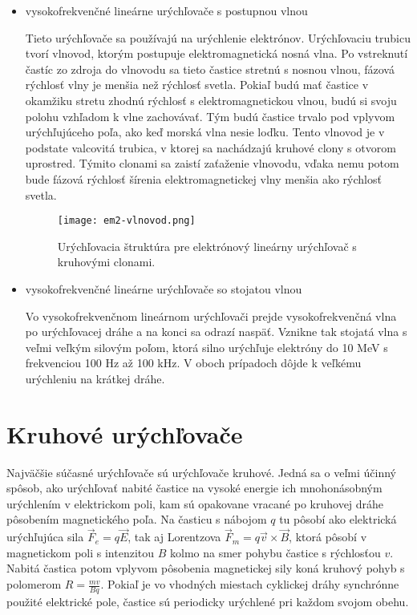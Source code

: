 \documentclass[../../main.tex]{subfiles}
\begin{document}
\begin{itemize}
\item vysokofrekvenčné lineárne urýchľovače s postupnou vlnou

Tieto urýchľovače sa používajú na urýchlenie elektrónov. Urýchľovaciu trubicu tvorí vlnovod, ktorým postupuje elektromagnetická nosná vlna. Po vstreknutí častíc zo zdroja do vlnovodu sa tieto častice stretnú s nosnou vlnou, fázová rýchlosť vlny je menšia než rýchlosť svetla. Pokiaľ budú mať častice v okamžiku stretu zhodnú rýchlosť s elektromagnetickou vlnou, budú si svoju polohu vzhľadom k vlne zachovávať. Tým budú častice trvalo pod vplyvom urýchľujúceho poľa, ako keď morská vlna nesie loďku. Tento vlnovod je v podstate valcovitá trubica, v ktorej sa nachádzajú kruhové clony s otvorom uprostred. Týmito clonami sa zaistí zaťaženie vlnovodu, vďaka nemu potom bude fázová rýchlosť šírenia elektromagnetickej vlny menšia ako rýchlosť svetla.

\begin{figure}[h]
\centering
\texttt{[image: em2-vlnovod.png]}
\caption{Urýchľovacia štruktúra pre elektrónový lineárny urýchľovač s kruhovými clonami.}
\label{em2:img:vlnovod}
\end{figure}

\item vysokofrekvenčné lineárne urýchľovače so stojatou vlnou

Vo vysokofrekvenčnom lineárnom urýchľovači prejde vysokofrekvenčná vlna po urýchľovacej dráhe a na konci sa odrazí naspäť. Vznikne tak stojatá vlna s veľmi veľkým silovým poľom, ktorá silno urýchľuje elektróny do 10 MeV s frekvenciou 100 Hz až 100 kHz. V oboch prípadoch dôjde k veľkému urýchleniu na krátkej dráhe.
\end{itemize} 

\section{Kruhové urýchľovače}

Najväčšie súčasné urýchľovače sú urýchľovače kruhové. Jedná sa o veľmi účinný spôsob, ako urýchľovať nabité častice na vysoké energie ich mnohonásobným urýchlením v elektrickom poli, kam sú opakovane vracané po kruhovej dráhe pôsobením magnetického poľa. Na časticu s nábojom $q$ tu pôsobí ako elektrická urýchľujúca sila $\vec{F}_e=q\vec{E}$, tak aj Lorentzova $\vec{F}_m=q\vec{v}\times\vec{B}$, ktorá pôsobí v magnetickom poli s intenzitou $B$ kolmo na smer pohybu častice s rýchlosťou $v$. Nabitá častica potom vplyvom pôsobenia magnetickej sily koná kruhový pohyb s polomerom $R=\frac{mv}{Bq}$. Pokiaľ je vo vhodných miestach cyklickej dráhy synchrónne použité elektrické pole, častice sú periodicky urýchlené pri každom svojom obehu.
\end{document}
